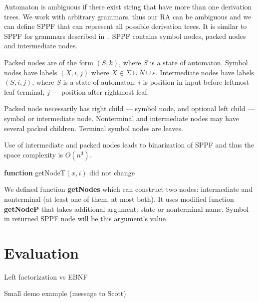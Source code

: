 \documentclass[runningheads,a4paper]{llncs}
\begin{document}
Automaton is ambiguous if there exist string that have more than one derivation trees. 
We work with arbitrary grammars, thus our RA can be ambiguous and we can define SPPF that can represent all possible derivation trees.
It is similar to SPPF for grammars described in~\cite{scott2013gll}. SPPF contains symbol nodes, packed nodes
and intermediate nodes. 

Packed nodes are of the form $(S, k)$, where $S$ is a state of automaton. 
Symbol nodes have labels $(X, i, j)$ where $X \in \Sigma \cup N \cup \varepsilon$. 
Intermediate nodes have labels $ (S, i, j) $, where $S$ is a state of automaton. $i$ is position in input before leftmost leaf terminal, $j$ --- position after rightmost leaf.

Packed node necessarily has right child --- symbol node, and optional left child --- symbol or intermediate node.
Nonterminal and intermediate nodes may have several packed children. 
Terminal symbol nodes are leaves.

Use of intermediate and packed nodes leads to binarization of SPPF and thus the space complexity is $O(n^{3})$.



\textbf{function} getNodeT$(x,i)$ did not change

We defined function \textbf{getNodes} which can construct two nodes: intermediate and nonterminal (at least one of them, at most both).
It uses modified function \textbf{getNodeP} that takes additional argument: state or nonterminal name. Symbol in returned SPPF node will be this argument's value.



\section{Evaluation}

Left factorization vs EBNF

Small demo example (message to Scott)
\end{document}

